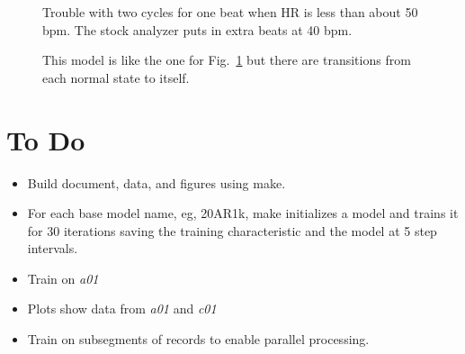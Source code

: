 \documentclass[12pt]{article}
\begin{document}
\begin{figure}
  \centering
    \caption{Trouble with two cycles for one beat when HR is less than
      about 50 bpm.  The stock analyzer puts in extra beats at 40 bpm.}
  \label{fig:modelAR3_300_double}
\end{figure}

\begin{figure}
  \centering
    \caption{This model is like the one for
      Fig.~\ref{fig:modelAR3_300_double} but there are transitions
      from each normal state to itself.}
  \label{fig:modelAR3A_300_double}
\end{figure}

\section{To Do}
\label{sec:todo}

\begin{itemize}
\item Build document, data, and figures using make.
\item For each base model name, eg, 20AR1k, make initializes a model
  and trains it for 30 iterations saving the training characteristic
  and the model at 5 step intervals.
\item Train on \emph{a01}
\item Plots show data from \emph{a01} and \emph{c01}
\item Train on subsegments of records to enable parallel processing.
\end{itemize}
\end{document}
